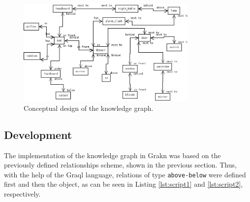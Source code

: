 \begin{figure}[H]
    \centering
    \includegraphics[width=8.8cm]{figures/grafo.jpg}
    \caption{Conceptual design of the knowledge graph.}
    \label{fig:grafo}
\end{figure}

\subsection{Development}

The implementation of the knowledge graph in Grakn was based on the previously defined relationships scheme, shown in the previous section. Thus, with the help of the Graql language, relations of type \texttt{above-below} were defined first and then the object, as can be seen in Listing \ref{lst:script1} and \ref{lst:script2}, respectively.





